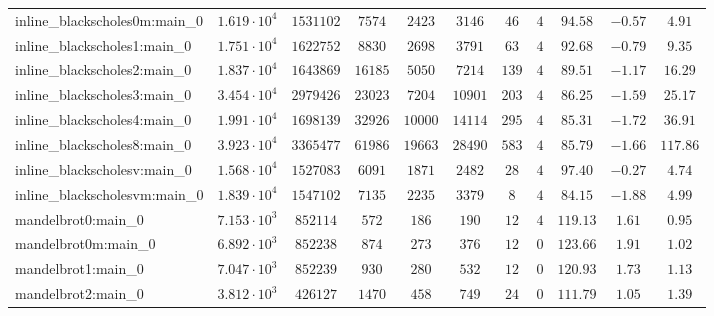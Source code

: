 \begin{tabular}{|l|c|c|c|c|c|c|c|c|c|c|}
inline\_blackscholes0m:main\_0 & $ 1.619 \cdot 10^{4} $ & $ 1531102  $ & $ 7574   $ & $ 2423   $ & $ 3146   $ & $ 46   $ & $ 4    $ & $ 94.58       $ & $ -0.57   $ & $ 4.91    $ \\
inline\_blackscholes1:main\_0  & $ 1.751 \cdot 10^{4} $ & $ 1622752  $ & $ 8830   $ & $ 2698   $ & $ 3791   $ & $ 63   $ & $ 4    $ & $ 92.68       $ & $ -0.79   $ & $ 9.35    $ \\
inline\_blackscholes2:main\_0  & $ 1.837 \cdot 10^{4} $ & $ 1643869  $ & $ 16185  $ & $ 5050   $ & $ 7214   $ & $ 139  $ & $ 4    $ & $ 89.51       $ & $ -1.17   $ & $ 16.29   $ \\
inline\_blackscholes3:main\_0  & $ 3.454 \cdot 10^{4} $ & $ 2979426  $ & $ 23023  $ & $ 7204   $ & $ 10901  $ & $ 203  $ & $ 4    $ & $ 86.25       $ & $ -1.59   $ & $ 25.17   $ \\
inline\_blackscholes4:main\_0  & $ 1.991 \cdot 10^{4} $ & $ 1698139  $ & $ 32926  $ & $ 10000  $ & $ 14114  $ & $ 295  $ & $ 4    $ & $ 85.31       $ & $ -1.72   $ & $ 36.91   $ \\
inline\_blackscholes8:main\_0  & $ 3.923 \cdot 10^{4} $ & $ 3365477  $ & $ 61986  $ & $ 19663  $ & $ 28490  $ & $ 583  $ & $ 4    $ & $ 85.79       $ & $ -1.66   $ & $ 117.86  $ \\
inline\_blackscholesv:main\_0  & $ 1.568 \cdot 10^{4} $ & $ 1527083  $ & $ 6091   $ & $ 1871   $ & $ 2482   $ & $ 28   $ & $ 4    $ & $ 97.40       $ & $ -0.27   $ & $ 4.74    $ \\
inline\_blackscholesvm:main\_0 & $ 1.839 \cdot 10^{4} $ & $ 1547102  $ & $ 7135   $ & $ 2235   $ & $ 3379   $ & $ 8    $ & $ 4    $ & $ 84.15       $ & $ -1.88   $ & $ 4.99    $ \\
mandelbrot0:main\_0            & $ 7.153 \cdot 10^{3} $ & $ 852114   $ & $ 572    $ & $ 186    $ & $ 190    $ & $ 12   $ & $ 4    $ & $ 119.13      $ & $ 1.61    $ & $ 0.95    $ \\
mandelbrot0m:main\_0           & $ 6.892 \cdot 10^{3} $ & $ 852238   $ & $ 874    $ & $ 273    $ & $ 376    $ & $ 12   $ & $ 0    $ & $ 123.66      $ & $ 1.91    $ & $ 1.02    $ \\
mandelbrot1:main\_0            & $ 7.047 \cdot 10^{3} $ & $ 852239   $ & $ 930    $ & $ 280    $ & $ 532    $ & $ 12   $ & $ 0    $ & $ 120.93      $ & $ 1.73    $ & $ 1.13    $ \\
mandelbrot2:main\_0            & $ 3.812 \cdot 10^{3} $ & $ 426127   $ & $ 1470   $ & $ 458    $ & $ 749    $ & $ 24   $ & $ 0    $ & $ 111.79      $ & $ 1.05    $ & $ 1.39    $ \\

\end{tabular}
